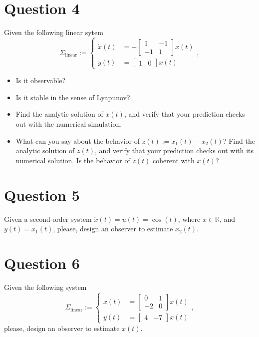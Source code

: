 \documentclass[11pt,a4paper,titlepage]{article}
\begin{document}
\section{Question 4}
Given the following linear sytem
\begin{equation}
	\Sigma_{\text{linear}} := \begin{cases}
		\dot x(t) &= -\begin{bmatrix}1 & -1 \\ -1 & 1\end{bmatrix}x(t) \\
			y(t) &= \begin{bmatrix}1 & 0\end{bmatrix}x(t)
	\end{cases},
\label{eq: sigmalin}
\end{equation}

\begin{itemize}
\item Is it observable?
\item Is it stable in the sense of Lyapunov?
\item Find the analytic solution of $x(t)$, and verify that your prediction checks out with the numerical simulation.
\item What can you say about the behavior of $z(t) := x_1(t) - x_2(t)$? Find the analytic solution of $z(t)$, and verify that your prediction checks out with its numerical solution. Is the behavior of $z(t)$ coherent with $x(t)$?
\end{itemize}

\section{Question 5}
Given a second-order system $\ddot x(t) = u(t) = \cos(t)$, where $x\in\mathbb{R}$, and $y(t) = x_1(t)$, please, design an observer to estimate $x_2(t)$.

\section{Question 6}
Given the following system
\begin{equation}
	\Sigma_{\text{linear}} := \begin{cases}
		\dot x(t) &= \begin{bmatrix}0 & 1 \\ -2 & 0\end{bmatrix}x(t) \\
			y(t) &= \begin{bmatrix}4 & -7\end{bmatrix}x(t)
	\end{cases},
\label{eq: sigmalin}
\end{equation}
please, design an observer to estimate $x(t)$.
\end{document}
